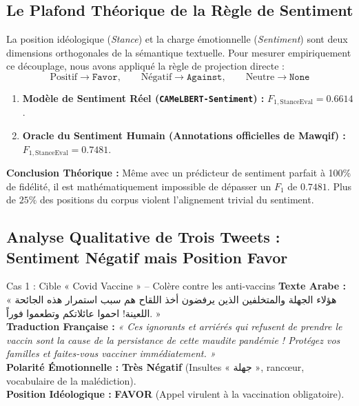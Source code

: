 \documentclass[11pt,a4paper]{article}
\begin{document}
\subsection{Le Plafond Théorique de la Règle de Sentiment}
La position idéologique (\textit{Stance}) et la charge émotionnelle (\textit{Sentiment}) sont deux dimensions orthogonales de la sémantique textuelle. Pour mesurer empiriquement ce découplage, nous avons appliqué la règle de projection directe :
\begin{equation}
    \text{Positif} \to \texttt{Favor}, \qquad \text{Négatif} \to \texttt{Against}, \qquad \text{Neutre} \to \texttt{None}
\end{equation}
\begin{enumerate}
    \item \textbf{Modèle de Sentiment Réel (\texttt{CAMeLBERT-Sentiment}) :} $F_{1,\text{StanceEval}} = \mathbf{0.6614}$.
    \item \textbf{Oracle du Sentiment Humain (Annotations officielles de Mawqif) :} $F_{1,\text{StanceEval}} = \mathbf{0.7481}$.
\end{enumerate}
\textbf{Conclusion Théorique :} Même avec un prédicteur de sentiment parfait à 100\% de fidélité, il est mathématiquement impossible de dépasser un $F_1$ de $0.7481$. Plus de $25\%$ des positions du corpus violent l'alignement trivial du sentiment.

\subsection{Analyse Qualitative de Trois Tweets : Sentiment Négatif mais Position Favor}

\begin{arabicexample}{Cas 1 : Cible « Covid Vaccine » – Colère contre les anti-vaccins}
\textbf{Texte Arabe :}  
« هؤلاء الجهلة والمتخلفين الذين يرفضون أخذ اللقاح هم سبب استمرار هذه الجائحة اللعينة! احموا عائلاتكم وتطعموا فوراً. »\\
\textbf{Traduction Française :}  
\textit{« Ces ignorants et arriérés qui refusent de prendre le vaccin sont la cause de la persistance de cette maudite pandémie ! Protégez vos familles et faites-vous vacciner immédiatement. »}\\
\textbf{Polarité Émotionnelle :} \textbf{Très Négatif} (Insultes « جهلة », rancœur, vocabulaire de la malédiction).\\
\textbf{Position Idéologique :} \textbf{FAVOR} (Appel virulent à la vaccination obligatoire).
\end{arabicexample}
\end{document}
